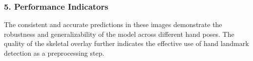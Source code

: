 \subsubsection*{5. Performance Indicators}
The consistent and accurate predictions in these images demonstrate the robustness and generalizability of the model across different hand poses. The quality of the skeletal overlay further indicates the effective use of hand landmark detection as a preprocessing step.





